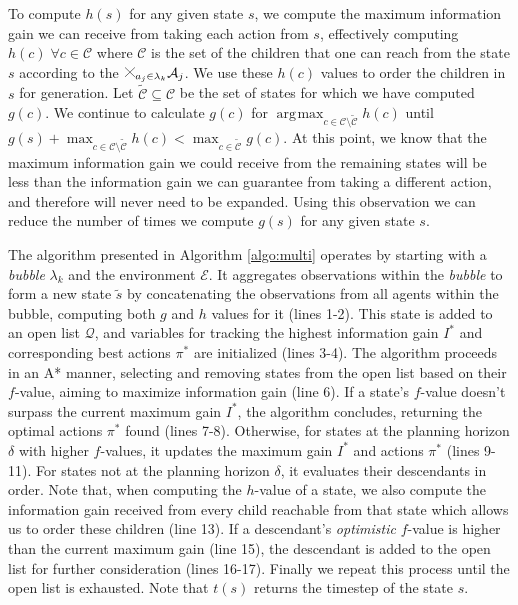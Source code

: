 \documentclass[letterpaper, 10 pt, conference]{IEEEConference}
\DeclareMathOperator*{\argmax}{\arg\!\max}
\newcommand{\cross}{
  \begin{tikzpicture}[scale=0.25]
    \draw (0,0) -- (1,1);
    \draw (0,1) -- (1,0);
  \end{tikzpicture}
}
\begin{document}
To compute $h(s)$ for any given state $s$, we compute the maximum information gain we can receive from taking each action from $s$, effectively computing $h(c) \; \forall c \in \mathcal{C}$ where $\mathcal{C}$ is the set of the children that one can reach from the state $s$ according to the $\cross_{a_j \in \lambda_k} \mathcal{A}_j$. We use these $h(c)$ values to order the children in $s$ for generation. Let $\tilde{\mathcal{C}} \subseteq \mathcal{C}$ be the set of states for which we have computed $g(c)$. We continue to calculate $g(c)$ for $\argmax_{ c \in \mathcal{C} \setminus \tilde{\mathcal{C}}} h(c)$ until $g(s) + \max_{ c \in \mathcal{C} \setminus \tilde{\mathcal{C}}} h(c) < \max_{c \in \tilde{\mathcal{C}}} g(c)$. At this point, we know that the maximum information gain we could receive from the remaining states will be less than the information gain we can guarantee from taking a different action, and therefore will never need to be expanded. Using this observation we can reduce the number of times we compute $g(s)$ for any given state $s$. 

The  algorithm presented in Algorithm \ref{algo:multi} operates by starting with a \textit{bubble} $\lambda_k$ and the environment $\mathcal{E}$. It aggregates observations within the \textit{bubble} to form a new state $\tilde{s}$ by concatenating the observations from all agents within the bubble, computing both $g$ and $h$ values for it (lines 1-2). This state is added to an open list $\mathcal{Q}$, and variables for tracking the highest information gain $I^*$ and corresponding best actions $\pi^*$ are initialized (lines 3-4). The algorithm proceeds in an A* manner, selecting and removing states from the open list based on their $f$-value, aiming to maximize information gain (line 6). If a state's $f$-value doesn't surpass the current maximum gain $I^*$, the algorithm concludes, returning the optimal actions $\pi^*$ found (lines 7-8). Otherwise, for states at the planning horizon $\delta$ with higher $f$-values, it updates the maximum gain $I^*$ and actions $\pi^*$ (lines 9-11). For states not at the planning horizon $\delta$, it evaluates their descendants in order. Note that, when computing the $h$-value of a state, we also compute the information gain received from every child reachable from that state which allows us to order these children (line 13). If a descendant's \textit{optimistic} $f$-value is higher than the current maximum gain (line 15), the descendant is added to the open list for further consideration (lines 16-17). Finally we repeat this process until the open list is exhausted. Note that $t(s)$ returns the timestep of the state $s$.
\end{document}

